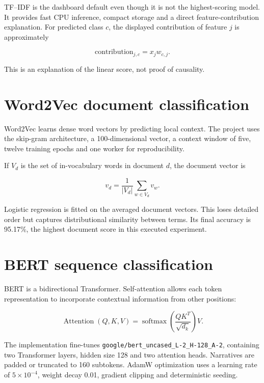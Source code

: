 \documentclass[12pt,a4paper]{report}
\newcommand{\code}[1]{\texttt{#1}}
\begin{document}
TF--IDF is the dashboard default even though it is not the highest-scoring model. It provides fast CPU inference, compact storage and a direct feature-contribution explanation. For predicted class $c$, the displayed contribution of feature $j$ is approximately

\begin{equation}
\text{contribution}_{j,c}=x_jw_{c,j}.
\end{equation}

This is an explanation of the linear score, not proof of causality.

\section{Word2Vec document classification}

Word2Vec learns dense word vectors by predicting local context. The project uses the skip-gram architecture, a 100-dimensional vector, a context window of five, twelve training epochs and one worker for reproducibility.

If $V_d$ is the set of in-vocabulary words in document $d$, the document vector is

\begin{equation}
v_d=\frac{1}{|V_d|}\sum_{w\in V_d}v_w.
\end{equation}

Logistic regression is fitted on the averaged document vectors. This loses detailed order but captures distributional similarity between terms. Its final accuracy is 95.17\%, the highest document score in this executed experiment.

\section{BERT sequence classification}

BERT is a bidirectional Transformer. Self-attention allows each token representation to incorporate contextual information from other positions:

\begin{equation}
\operatorname{Attention}(Q,K,V)=\operatorname{softmax}\left(\frac{QK^T}{\sqrt{d_k}}\right)V.
\end{equation}

The implementation fine-tunes \code{google/bert\_uncased\_L-2\_H-128\_A-2}, containing two Transformer layers, hidden size 128 and two attention heads. Narratives are padded or truncated to 160 subtokens. AdamW optimization uses a learning rate of $5\times10^{-4}$, weight decay 0.01, gradient clipping and deterministic seeding.
\end{document}

